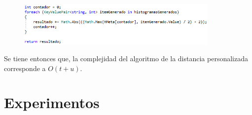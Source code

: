 \documentclass[journal]{IEEEtran}
\begin{document}
\begin{itemize}
	\begin{figure}[h]
		\centering
		\includegraphics[width = 280pt]{DistanciaPropia2.png}
		\caption{ }
	\end{figure}
	
	Se tiene entonces que, la complejidad del algoritmo de la distancia personalizada corresponde a $ O(t + u) $. \\
	

\end{itemize}

\newpage
\section{Experimentos}
 
\end{document}
